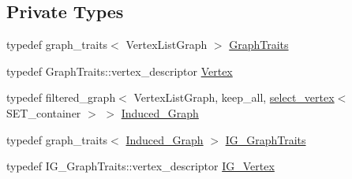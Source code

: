 \subsection*{Private Types}
\begin{DoxyCompactItemize}
\item 
typedef graph\+\_\+traits$<$ Vertex\+List\+Graph $>$ \hyperlink{classboost_1_1maxclique__dsatur__coloring__helper_a6f1b584e178237affdd69676e51eb316}{Graph\+Traits}
\item 
typedef Graph\+Traits\+::vertex\+\_\+descriptor \hyperlink{classboost_1_1maxclique__dsatur__coloring__helper_af5c1839ff3006967b2f34e9eb96161ef}{Vertex}
\item 
typedef filtered\+\_\+graph$<$ Vertex\+List\+Graph, keep\+\_\+all, \hyperlink{structboost_1_1select__vertex}{select\+\_\+vertex}$<$ S\+E\+T\+\_\+container $>$ $>$ \hyperlink{classboost_1_1maxclique__dsatur__coloring__helper_a2928978558b9545fe58e467dd8adf0e5}{Induced\+\_\+\+Graph}
\item 
typedef graph\+\_\+traits$<$ \hyperlink{classboost_1_1maxclique__dsatur__coloring__helper_a2928978558b9545fe58e467dd8adf0e5}{Induced\+\_\+\+Graph} $>$ \hyperlink{classboost_1_1maxclique__dsatur__coloring__helper_a7e7d643710dac81b6aedfd442d226424}{I\+G\+\_\+\+Graph\+Traits}
\item 
typedef I\+G\+\_\+\+Graph\+Traits\+::vertex\+\_\+descriptor \hyperlink{classboost_1_1maxclique__dsatur__coloring__helper_aaedfd2b04cb4322182812033fcc9f879}{I\+G\+\_\+\+Vertex}
\end{DoxyCompactItemize}
